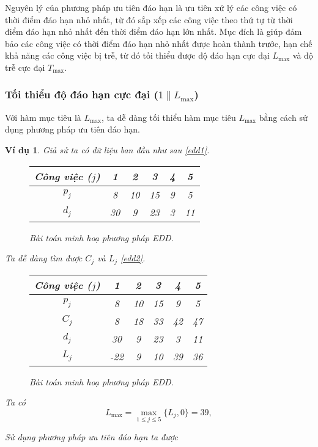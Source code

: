 \documentclass[12pt,a4paper]{report}
\newtheorem{vd}{Ví dụ}
\begin{document}
Nguyên lý của phương pháp ưu tiên đáo hạn là ưu tiên xử lý các công việc có thời điểm đáo hạn nhỏ nhất, từ đó sắp xếp các công việc theo thứ tự từ thời điểm đáo hạn nhỏ nhất đến thời điểm đáo hạn lớn nhất. Mục đích là giúp đảm bảo các công việc có thời điểm đáo hạn nhỏ nhất được hoàn thành trước, hạn chế khả năng các công việc bị trễ, từ đó tối thiểu được độ đáo hạn cực đại $L_{\max}$ và độ trễ cực đại $T_{\max}$.

\subsubsection*{Tối thiểu độ đáo hạn cực đại ($1 \| L_{\max}$)}
Với hàm mục tiêu là $L_{\max}$, ta dễ dàng tối thiểu hàm mục tiêu $L_{\max}$ bằng cách sử dụng phương pháp ưu tiên đáo hạn.

\begin{vd}
Giả sử ta có dữ liệu ban đầu như sau \eqref{edd1}.
\begin{figure}[h!]
\centering
	\begin{tabular}{|c | c c c c c |} 
	\hline
	Công việc ($j$) & 1 & 2 & 3 & 4 & 5 \\
	\hline\hline
	$p_j$ & 8 & 10 & 15 & 9 & 5 \\
	$d_j$ & 30 & 9 & 23 & 3 & 11 \\
	\hline
	\end{tabular}
	\caption{\label{edd1} Bài toán minh hoạ phương pháp EDD.}
\end{figure}

Ta dễ dàng tìm được $C_j$ và $L_j$ \eqref{edd2}.
\begin{figure}[h!]
\centering
	\begin{tabular}{|c | c c c c c |} 
	\hline
	Công việc ($j$) & 1 & 2 & 3 & 4 & 5 \\
	\hline\hline
	$p_j$ & 8 & 10 & 15 & 9 & 5 \\
	$C_j$ & 8 & 18 & 33 & 42 & 47 \\
	$d_j$ & 30 & 9 & 23 & 3 & 11 \\
	$L_j$ & -22 & 9 & 10 & 39 & 36 \\
	\hline
	\end{tabular}
	\caption{\label{edd2} Bài toán minh hoạ phương pháp EDD.}
\end{figure}

Ta có
\begin{equation*}
	L_{\max} = \max _{1 \leq j \leq 5} \{L_j, 0\} = 39,
\end{equation*}

Sử dụng phương pháp ưu tiên đáo hạn ta được


\end{vd}
\end{document}
